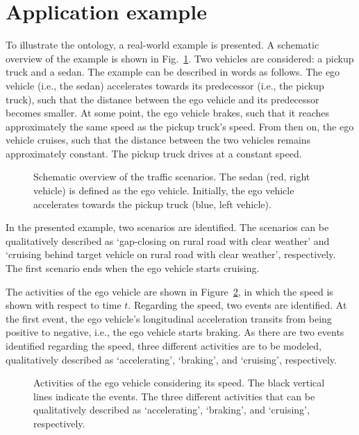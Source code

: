 \section{Application example}
\label{sec:example}

To illustrate the ontology, a real-world example is presented. A schematic overview of the example is shown in Fig.~\ref{fig:example schematic}. Two vehicles are considered: a pickup truck and a sedan. The example can be described in words as follows. The ego vehicle (i.e., the sedan) accelerates towards its predecessor (i.e., the pickup truck), such that the distance between the ego vehicle and its predecessor becomes smaller. At some point, the ego vehicle brakes, such that it reaches approximately the same speed as the pickup truck's speed. From then on, the ego vehicle cruises, such that the distance between the two vehicles remains approximately constant. The pickup truck drives at a constant speed.

\begin{figure}
	\centering
	\setlength\figureheight{121pt}
	\setlength\figurewidth{260pt}
	
	\caption{Schematic overview of the traffic scenarios. The sedan (red, right vehicle) is defined as the ego vehicle. Initially, the ego vehicle accelerates towards the pickup truck (blue, left vehicle).}
	\label{fig:example schematic}
	\spaceaftercaption
\end{figure}

In the presented example, two scenarios are identified. The scenarios can be qualitatively described as `gap-closing on rural road with clear weather' and `cruising behind target vehicle on rural road with clear weather', respectively. The first scenario ends when the ego vehicle starts cruising. 

The activities of the ego vehicle are shown in Figure~\ref{fig:example ego states}, in which the speed is shown with respect to time $t$. Regarding the speed, two events are identified. At the first event, the ego vehicle's longitudinal acceleration transits from being positive to negative, i.e., the ego vehicle starts braking. As there are two events identified regarding the speed, three different activities are to be modeled, qualitatively described as `accelerating', `braking', and `cruising', respectively. 

\begin{figure}
	\centering
	\setlength\figureheight{130pt}
	\setlength\figurewidth{248pt}
	
	\caption{Activities of the ego vehicle considering its speed. The black vertical lines indicate the events. The three different activities that can be qualitatively described as `accelerating', `braking', and `cruising', respectively.}
	\label{fig:example ego states}
	\spaceaftercaption
\end{figure}

